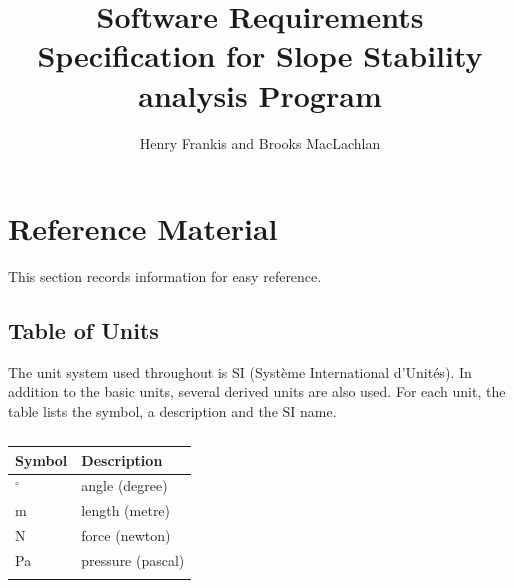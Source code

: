\documentclass[12pt]{article}
\title{Software Requirements Specification for Slope Stability analysis Program}
\author{Henry Frankis and Brooks MacLachlan}
\begin{document}
\maketitle
\tableofcontents
\newpage
\section{Reference Material}
\label{Sec:RefMat}
This section records information for easy reference.
\subsection{Table of Units}
\label{Sec:ToU}
The unit system used throughout is SI (Système International d'Unités). In addition to the basic units, several derived units are also used. For each unit, the table lists the symbol, a description and the SI name.
\begin{longtable}{l l}
\toprule
Symbol & Description
\\
\midrule
\endhead
${}^{\circ}$ & angle (degree)
\\
m & length (metre)
\\
N & force (newton)
\\
Pa & pressure (pascal)
\\
\bottomrule
\caption{}
\label{Table:ToU}
\end{longtable}
\end{document}
